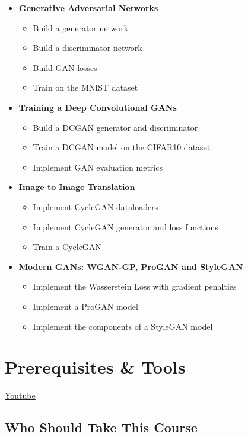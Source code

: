 \begin{itemize}
    \item \textbf{Generative Adversarial Networks}
    \begin{itemize}
        \item Build a generator network
        \item Build a discriminator network
        \item Build GAN losses
        \item Train on the MNIST dataset
    \end{itemize}
    \item \textbf{Training a Deep Convolutional GANs}
    \begin{itemize}
        \item Build a DCGAN generator and discriminator
        \item Train a DCGAN model on the CIFAR10 dataset
        \item Implement GAN evaluation metrics
    \end{itemize}
    \item \textbf{Image to Image Translation}
    \begin{itemize}
        \item Implement CycleGAN dataloaders
        \item Implement CycleGAN generator and loss functions
        \item Train a CycleGAN
    \end{itemize}
    \item \textbf{Modern GANs: WGAN-GP, ProGAN and StyleGAN}
    \begin{itemize}
        \item Implement the Wasserstein Loss with gradient penalties
        \item Implement a ProGAN model
        \item Implement the components of a StyleGAN model
    \end{itemize}
\end{itemize}

\section{Prerequisites \& Tools}
\href{https://www.youtube.com/watch?v=hPKDrtwDj9g&t=1s}{Youtube} \newline

\subsection{Who Should Take This Course}

